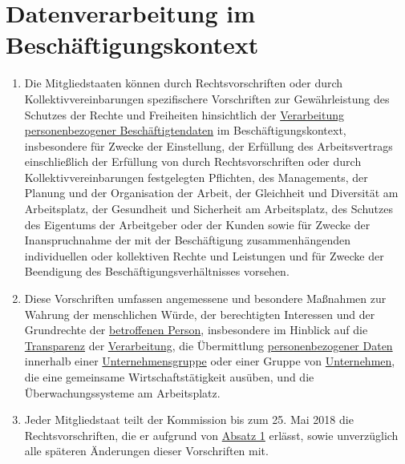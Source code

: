 \chapter{Datenverarbeitung im Beschäftigungskontext}
\label{ch:88}


\begin{enumerate}

  \item Die Mitgliedstaaten können durch Rechtsvorschriften oder durch Kollektivvereinbarungen spezifischere
   Vorschriften zur Gewährleistung des Schutzes der Rechte und Freiheiten hinsichtlich der \hyperref[itm:04-2]
   {Verarbeitung}
   \hyperref[itm:04-1]{personenbezogener Beschäftigtendaten} im Beschäftigungskontext, insbesondere für Zwecke der
    Einstellung, der Erfüllung des Arbeitsvertrags einschließlich der Erfüllung von durch Rechtsvorschriften oder durch
    Kollektivvereinbarungen festgelegten Pflichten, des Managements, der Planung und der Organisation der Arbeit, der
    Gleichheit und Diversität am Arbeitsplatz, der Gesundheit und Sicherheit am Arbeitsplatz, des Schutzes des
    Eigentums der Arbeitgeber oder der Kunden sowie für Zwecke der Inanspruchnahme der mit der Beschäftigung
    zusammenhängenden individuellen oder kollektiven Rechte und Leistungen und für Zwecke der Beendigung des
    Beschäftigungsverhältnisses vorsehen.
  \label{itm:88-1}

  \item Diese Vorschriften umfassen angemessene und besondere Maßnahmen zur Wahrung der menschlichen Würde, der
   berechtigten Interessen und der Grundrechte der \hyperref[itm:04-1]{betroffenen Person}, insbesondere im Hinblick
   auf die \hyperref[itm:05-1a]{Transparenz} der
   \hyperref[itm:04-2]{Verarbeitung}, die Übermittlung \hyperref[itm:04-1]{personenbezogener Daten} innerhalb
    einer \hyperref[itm:04-19]{Unternehmensgruppe} oder einer Gruppe von
   \hyperref[itm:04-18]{Unternehmen}, die eine gemeinsame Wirtschaftstätigkeit ausüben, und die Überwachungssysteme am
    Arbeitsplatz.
  \label{itm:88-2}

  \item Jeder Mitgliedstaat teilt der Kommission bis zum 25. Mai 2018 die Rechtsvorschriften, die er aufgrund von
   \hyperref[itm:88-1]{Absatz 1} erlässt, sowie unverzüglich alle späteren Änderungen dieser Vorschriften mit.
  \label{itm:88-3}

\end{enumerate}


